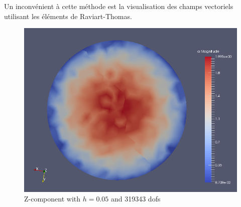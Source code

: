\documentclass[a4paper,11pt]{article}
\begin{document}
Un inconvénient à cette méthode est la visualisation des champs vectoriels utilisant les éléments de Raviart-Thomas. 

\begin{figure}[H]
  \centering
  \includegraphics[scale=0.5]{aRT}
  \caption{Z-component with $h=0.05$ and 319343 dofs}
\end{figure}
\end{document}
